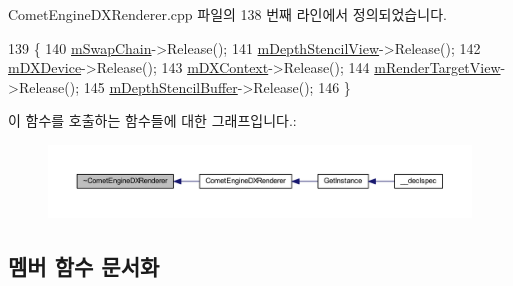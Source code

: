 Comet\+Engine\+D\+X\+Renderer.\+cpp 파일의 138 번째 라인에서 정의되었습니다.


\begin{DoxyCode}
139 \{
140     \hyperlink{class_comet_engine_1_1_renderer_1_1_comet_engine_d_x_renderer_a501ef6e0fe112727e82e727997af01c6}{mSwapChain}->Release();
141     \hyperlink{class_comet_engine_1_1_renderer_1_1_comet_engine_d_x_renderer_a01cc1c2c77d9af90d45c250d51bcfa35}{mDepthStencilView}->Release();
142     \hyperlink{class_comet_engine_1_1_renderer_1_1_comet_engine_d_x_renderer_ac606b85554250d2e65a2aa9f10e6aa45}{mDXDevice}->Release();
143     \hyperlink{class_comet_engine_1_1_renderer_1_1_comet_engine_d_x_renderer_ad38b8ad7fd1c747698a96256e75eb635}{mDXContext}->Release();
144     \hyperlink{class_comet_engine_1_1_renderer_1_1_comet_engine_d_x_renderer_a109e138c97280440a0955d475441f49d}{mRenderTargetView}->Release();
145     \hyperlink{class_comet_engine_1_1_renderer_1_1_comet_engine_d_x_renderer_a738b786f64e4fc6c9a2355f1cf9ae830}{mDepthStencilBuffer}->Release();
146 \}
\end{DoxyCode}
이 함수를 호출하는 함수들에 대한 그래프입니다.\+:\nopagebreak
\begin{figure}[H]
\begin{center}
\leavevmode
\includegraphics[width=350pt]{class_comet_engine_1_1_renderer_1_1_comet_engine_d_x_renderer_a7ec2ab41325dc127a1780c88d84a81e2_icgraph}
\end{center}
\end{figure}


\subsection{멤버 함수 문서화}
\mbox{\label{class_comet_engine_1_1_renderer_1_1_comet_engine_d_x_renderer_a0cec813dd654a43d162981c37b0cbf6e}} 
